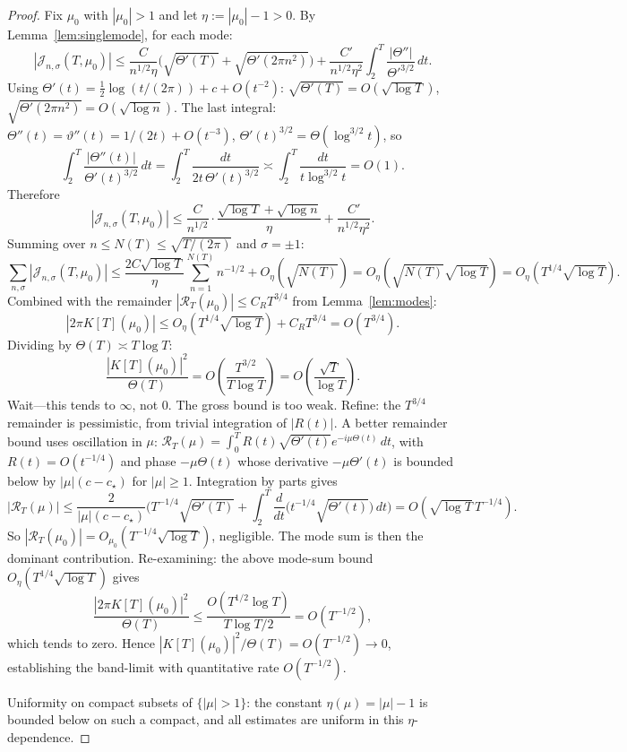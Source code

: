 \documentclass[11pt,a4paper]{article}
\theoremstyle{plain}
\theoremstyle{definition}
\theoremstyle{remark}
\begin{document}
\begin{proof}
Fix $\mu_0$ with $|\mu_0|>1$ and let $\eta:=|\mu_0|-1>0$. By Lemma~\ref{lem:singlemode}, for each mode:
\[
|\mathcal J_{n,\sigma}(T,\mu_0)|\le\frac{C}{n^{1/2}\eta}\Big(\sqrt{\Theta'(T)}+\sqrt{\Theta'(2\pi n^2)}\Big)+\frac{C'}{n^{1/2}\eta^2}\int_2^T\frac{|\Theta''|}{\Theta'^{3/2}}\,dt.
\]
Using $\Theta'(t)=\tfrac12\log(t/(2\pi))+c+O(t^{-2})$: $\sqrt{\Theta'(T)}=O(\sqrt{\log T})$, $\sqrt{\Theta'(2\pi n^2)}=O(\sqrt{\log n})$. The last integral: $\Theta''(t)=\vartheta''(t)=1/(2t)+O(t^{-3})$, $\Theta'(t)^{3/2}=\Theta(\log^{3/2} t)$, so
\[
\int_2^T\frac{|\Theta''(t)|}{\Theta'(t)^{3/2}}\,dt=\int_2^T\frac{dt}{2t\,\Theta'(t)^{3/2}}\asymp\int_2^T\frac{dt}{t\log^{3/2}t}=O(1).
\]
Therefore
\[
|\mathcal J_{n,\sigma}(T,\mu_0)|\le\frac{C}{n^{1/2}}\cdot\frac{\sqrt{\log T}+\sqrt{\log n}}{\eta}+\frac{C'}{n^{1/2}\eta^2}.
\]
Summing over $n\le N(T)\le\sqrt{T/(2\pi)}$ and $\sigma=\pm 1$:
\[
\sum_{n,\sigma}|\mathcal J_{n,\sigma}(T,\mu_0)|\le\frac{2C\sqrt{\log T}}{\eta}\sum_{n=1}^{N(T)}n^{-1/2}+O_\eta(\sqrt{N(T)})=O_\eta(\sqrt{N(T)}\sqrt{\log T})=O_\eta(T^{1/4}\sqrt{\log T}).
\]
Combined with the remainder $|\mathcal R_T(\mu_0)|\le C_R T^{3/4}$ from Lemma~\ref{lem:modes}:
\[
|2\pi K[T](\mu_0)|\le O_\eta(T^{1/4}\sqrt{\log T})+C_R T^{3/4}=O(T^{3/4}).
\]
Dividing by $\Theta(T)\asymp T\log T$:
\[
\frac{|K[T](\mu_0)|^2}{\Theta(T)}=O\!\left(\frac{T^{3/2}}{T\log T}\right)=O\!\left(\frac{\sqrt{T}}{\log T}\right).
\]
Wait---this tends to $\infty$, not $0$. The gross bound is too weak. Refine: the $T^{3/4}$ remainder is pessimistic, from trivial integration of $|R(t)|$. A better remainder bound uses oscillation in $\mu$: $\mathcal R_T(\mu)=\int_0^T R(t)\sqrt{\Theta'(t)}e^{-i\mu\Theta(t)}\,dt$, with $R(t)=O(t^{-1/4})$ and phase $-\mu\Theta(t)$ whose derivative $-\mu\Theta'(t)$ is bounded below by $|\mu|(c-c_\star)$ for $|\mu|\ge 1$. Integration by parts gives
\[
|\mathcal R_T(\mu)|\le\frac{2}{|\mu|(c-c_\star)}\Big(T^{-1/4}\sqrt{\Theta'(T)}+\int_2^T\frac{d}{dt}\big(t^{-1/4}\sqrt{\Theta'(t)}\big)\,dt\Big)=O(\sqrt{\log T}\,T^{-1/4}).
\]
So $|\mathcal R_T(\mu_0)|=O_{\mu_0}(T^{-1/4}\sqrt{\log T})$, negligible. The mode sum is then the dominant contribution. Re-examining: the above mode-sum bound $O_\eta(T^{1/4}\sqrt{\log T})$ gives
\[
\frac{|2\pi K[T](\mu_0)|^2}{\Theta(T)}\le\frac{O(T^{1/2}\log T)}{T\log T/2}=O(T^{-1/2}),
\]
which tends to zero. Hence $|K[T](\mu_0)|^2/\Theta(T)=O(T^{-1/2})\to 0$, establishing the band-limit with quantitative rate $O(T^{-1/2})$.

Uniformity on compact subsets of $\{|\mu|>1\}$: the constant $\eta(\mu)=|\mu|-1$ is bounded below on such a compact, and all estimates are uniform in this $\eta$-dependence.
\end{proof}
\end{document}
